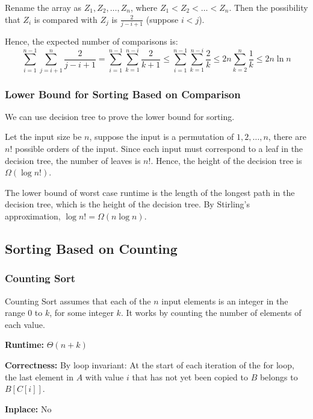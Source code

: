 \documentclass[a4paper,12pt]{article}
\begin{document}
Rename the array as $Z_1, Z_2, \dots, Z_n$, where $Z_1 < Z_2 < \dots < Z_n$.
Then the possibility that $Z_i$ is compared with $Z_j$ is $\frac{2}{j - i + 1}$ (suppose $i < j$).

Hence, the expected number of comparisons is:
\begin{equation*}
	\sum_{i = 1}^{n - 1} \sum_{j = i + 1}^{n} \frac{2}{j - i + 1} = \sum_{i = 1}^{n - 1} \sum_{k = 1}^{n - i} \frac{2}{k + 1} \leq \sum_{i = 1}^{n - 1} \sum_{k = 1}^{n - i} \frac{2}{k} \leq 2n \sum_{k = 2}^{n} \frac{1}{k} \leq 2n \ln n
\end{equation*}

\subsubsection{Lower Bound for Sorting Based on Comparison}

We can use decision tree to prove the lower bound for sorting.

Let the input size be $n$, suppose the input is a permutation of $1, 2, \dots, n$, there are $n!$ possible orders of the input.
Since each input must correspond to a leaf in the decision tree, the number of leaves is $n!$.
Hence, the height of the decision tree is $\Omega(\log n!)$.

The lower bound of worst case runtime is the length of the longest path in the decision tree, which is the height of the decision tree.
By Stirling's approximation, $\log n! = \Omega(n \log n)$.

\subsection{Sorting Based on Counting}

\subsubsection{Counting Sort}

Counting Sort assumes that each of the $n$ input elements is an integer in the range $0$ to $k$, for some integer $k$.
It works by counting the number of elements of each value.

\textbf{Runtime:} 
$\Theta(n + k)$

\textbf{Correctness:} 
By loop invariant:
At the start of each iteration of the for loop, the last element in $A$ with value $i$ that has not yet been copied to $B$ belongs to $B[C[i]]$.

\textbf{Inplace:}
No
\end{document}
